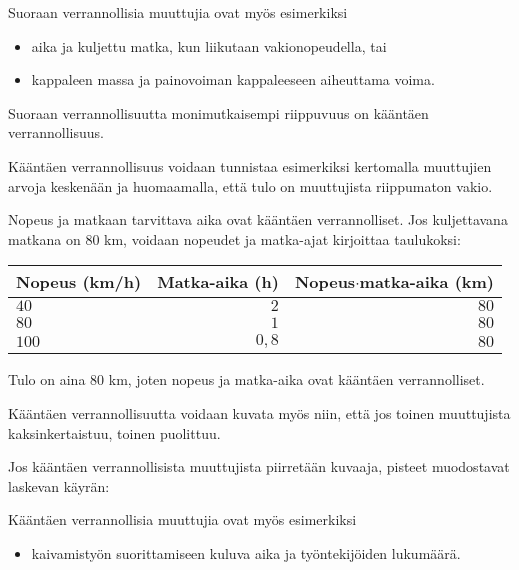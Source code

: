 Suoraan verrannollisia muuttujia ovat myös esimerkiksi
\begin{itemize}
    \item aika ja kuljettu matka, kun liikutaan vakionopeudella, tai
    \item kappaleen massa ja painovoiman kappaleeseen aiheuttama voima.
\end{itemize}

Suoraan verrannollisuutta monimutkaisempi riippuvuus on kääntäen
verrannollisuus.


Kääntäen verrannollisuus voidaan tunnistaa esimerkiksi
kertomalla muuttujien arvoja keskenään ja huomaamalla,
että tulo on muuttujista riippumaton vakio.

\begin{esimerkki}
Nopeus ja matkaan tarvittava aika ovat kääntäen verrannolliset.
Jos kuljettavana matkana on $80$ km, voidaan nopeudet ja matka-ajat
kirjoittaa taulukoksi:
\begin{center} 
\begin{tabular}{|l|r|r|}
\hline
Nopeus (km/h) & Matka-aika (h) & Nopeus$\cdot$matka-aika (km) \\
\hline
$40$ & $2$ & $80$ \\
$80$ & $1$ & $80$ \\
$100$ & $0,8$ & $80$ \\
\hline
\end{tabular}
\end{center}
Tulo on aina $80$ km, joten nopeus ja matka-aika ovat kääntäen verrannolliset.
\end{esimerkki}

Kääntäen verrannollisuutta voidaan kuvata myös niin, että jos
toinen muuttujista kaksinkertaistuu, toinen puolittuu.

Jos kääntäen verrannollisista muuttujista piirretään kuvaaja, pisteet
muodostavat laskevan käyrän:


Kääntäen verrannollisia muuttujia ovat myös esimerkiksi
\begin{itemize}
    \item kaivamistyön suorittamiseen kuluva aika ja työntekijöiden lukumäärä.
\end{itemize}

